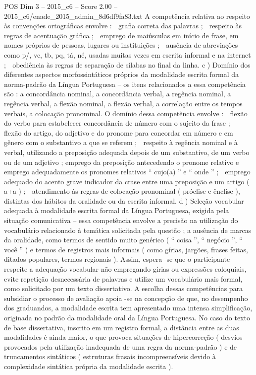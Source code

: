 \begin{textsample}{POS Dim 3 – 2015\_c6 – Score 2.00 – 2015\_c6/enade\_2015\_admin\_8d6df9fa83.txt}
A competência relativa ao respeito às convenções ortográficas envolve :  grafia correta das palavras ;  respeito às regras de acentuação gráfica ;  emprego de maiúsculas em início de frase, em nomes próprios de pessoas, lugares ou instituições ;  ausência de abreviações como p/, vc, tb, pq, tá, né, usadas muitas vezes em escrita informal e na internet ;  obediência às regras de separação de sílabas no final da linha. c ) Domínio dos diferentes aspectos morfossintáticos próprios da modalidade escrita formal da norma-padrão da Língua Portuguesa – os itens relacionados a essa competência são : a concordância nominal, a concordância verbal, a regência nominal, a regência verbal, a flexão nominal, a flexão verbal, a correlação entre os tempos verbais, a colocação pronominal.
O domínio dessa competência envolve :  flexão do verbo para estabelecer concordância de número com o sujeito da frase ;  flexão do artigo, do adjetivo e do pronome para concordar em número e em gênero com o substantivo a que se referem ;  respeito à regência nominal e à verbal, utilizando a preposição adequada depois de um substantivo, de um verbo ou de um adjetivo ; emprego da preposição antecedendo o pronome relativo e emprego adequadamente os pronomes relativos “ cujo(a) ” e “ onde ” ;  emprego adequado do acento grave indicador da crase entre uma preposição e um artigo ( a+a ) ;  atendimento às regras de colocação pronominal ( próclise e ênclise ), distintas dos hábitos da oralidade ou da escrita informal. d ) Seleção vocabular adequada à modalidade escrita formal da Língua Portuguesa, exigida pela situação comunicativa – essa competência envolve a precisão na utilização do vocabulário relacionado à temática solicitada pela questão ; a ausência de marcas da oralidade, como termos de sentido muito genérico ( “ coisa ”, “ negócio ”, “ você ” ) e termos de registros mais informais ( como gírias, jargões, frases feitas, ditados populares, termos regionais ).
Assim, espera -se que o participante respeite a adequação vocabular não empregando gírias ou expressões coloquiais, evite repetição desnecessária de palavras e utilize um vocabulário mais formal, como solicitado por um texto dissertativo.
A escolha dessas competências para subsidiar o processo de avaliação apoia -se na concepção de que, no desempenho dos graduandos, a modalidade escrita tem apresentado uma intensa simplificação, originada no padrão da modalidade oral da Língua Portuguesa.
No caso do texto de base dissertativa, inscrito em um registro formal, a distância entre as duas modalidades é ainda maior, o que provoca situações de hipercorreção ( desvios provocados pela utilização inadequada de uma regra da norma-padrão ) e de truncamentos sintáticos ( estruturas frasais incompreensíveis devido à complexidade sintática própria da modalidade escrita ).

\end{textsample}
